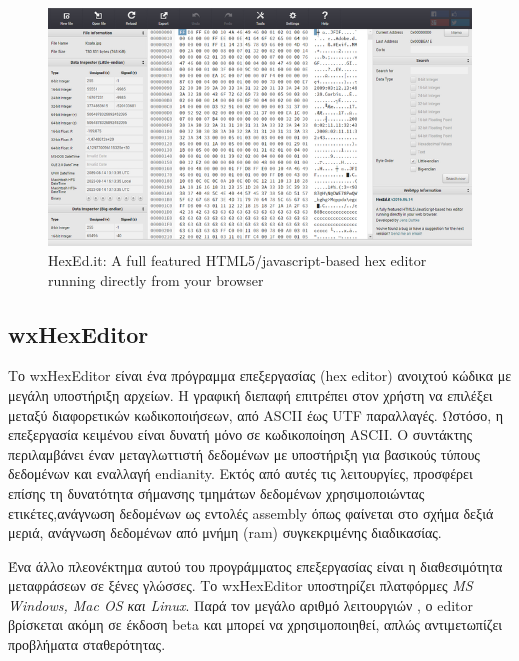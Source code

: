 \begin{figure}[ht]
\centering
\includegraphics[scale=0.5]{static/hexedit.png}

\caption{HexEd.it: A full featured HTML5/javascript-based hex editor running directly from your browser}
\label{hexedit}
\end{figure}

\pagebreak
\subsection{wxHexEditor}
Το wxHexEditor\cite{wxhex} είναι ένα πρόγραμμα επεξεργασίας (hex editor) ανοιχτού κώδικα με μεγάλη υποστήριξη αρχείων. 
Η γραφική διεπαφή επιτρέπει στον χρήστη να επιλέξει μεταξύ διαφορετικών κωδικοποιήσεων, από ASCII έως UTF παραλλαγές.
Ωστόσο, η επεξεργασία κειμένου είναι δυνατή μόνο σε κωδικοποίηση ASCII.
Ο συντάκτης περιλαμβάνει έναν μεταγλωττιστή δεδομένων με υποστήριξη για βασικούς τύπους δεδομένων και εναλλαγή endianity.
Εκτός από αυτές τις λειτουργίες, προσφέρει επίσης τη δυνατότητα σήμανσης τμημάτων δεδομένων χρησιμοποιώντας ετικέτες,ανάγνωση δεδομένων ως εντολές assembly όπως φαίνεται στο σχήμα \tetbf{\ref{wx}} δεξιά μεριά, ανάγνωση δεδομένων από μνήμη (ram) συγκεκριμένης διαδικασίας.

Ένα άλλο πλεονέκτημα αυτού του προγράμματος επεξεργασίας είναι η διαθεσιμότητα μεταφράσεων σε ξένες γλώσσες.
Το wxHexEditor υποστηρίζει πλατφόρμες \emph{MS Windows, Mac OS και Linux}.
Παρά τον μεγάλο αριθμό λειτουργιών , ο editor βρίσκεται ακόμη σε έκδοση beta και μπορεί να χρησιμοποιηθεί, απλώς αντιμετωπίζει προβλήματα σταθερότητας.

